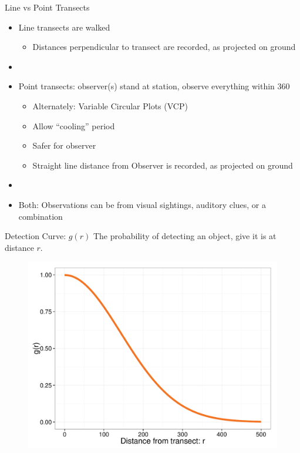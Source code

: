 \documentclass{beamer}
\begin{document}
\begin{frame}{Line vs Point Transects}
	\begin{itemize}
	\item Line transects are walked
	\begin{itemize}
		\item Distances perpendicular to transect are recorded, as projected on ground
	\end{itemize}
	\item[]
	\item Point transects: observer(s) stand at station, observe everything within 360\textdegree 
		\begin{itemize}
		\item Alternately: Variable Circular Plots (VCP)
		\item Allow ``cooling'' period
		\item Safer for observer
		\item Straight line distance from Observer is recorded, as projected on ground
		\end{itemize}
	\item[]		
	\item Both: Observations can be from visual sightings, auditory clues, or a combination
	\end{itemize}
\end{frame}



\begin{frame}{Detection Curve: $g(r)$}
The probability of detecting an object, give it is at distance $r$.
	\begin{figure}
		\centering
		\includegraphics[width=\textwidth,height=0.80\textheight,keepaspectratio=true]{../images/detectionCurve.pdf}
	\end{figure}
\end{frame}
\end{document}
